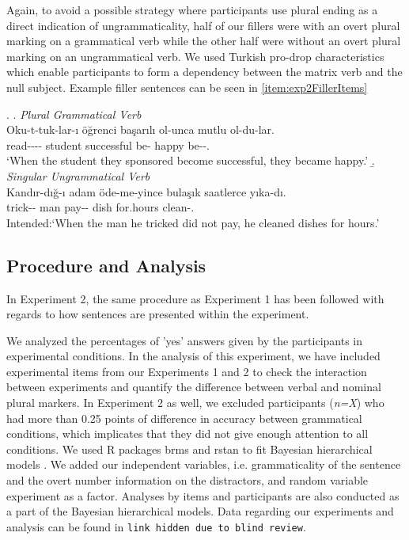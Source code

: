 \documentclass[doc,a4paper,man,natbib,floatsintext,noextraspace]{apa6}\usepackage[]{graphicx}\usepackage[]{color}
\begin{document}
Again, to avoid a possible strategy where participants use plural ending as a direct indication of ungrammaticality, half of our fillers were with an overt plural marking on a grammatical verb while the other half were without an overt plural marking on an ungrammatical verb. We used Turkish pro-drop characteristics which enable participants to form a dependency between the matrix verb and the null subject. Example filler sentences can be seen in \ref{item:exp2FillerItems} 

\ex. \label{item:exp2FillerItems}
\a. \textit{Plural Grammatical Verb}\\ 
\gll Oku-t-tuk-lar-ı öğrenci başarılı ol-unca mutlu ol-du-lar.\\ 
read-\Caus{}-\Nmlz{}-\Pl{}-\Poss{}  student successful be-\Nmlz{} happy be-\Pst{}-\Pl{}.\\
\glt `When the student they sponsored become successful, they became happy.' 
\b. \textit{Singular Ungrammatical Verb}\\ 
\gll *Kandır-dığ-ı adam öde-me-yince bulaşık saatlerce yıka-dı.\\ 
trick-\Nmlz{}-\Poss{}  man pay-\Neg{}-\Nmlz{} dish for.hours clean-\Pst{}.\\
\glt Intended:`When the man he tricked did not pay, he cleaned dishes for hours.'


\subsection{Procedure and Analysis} \label{sec:exp2:procedure_analysis}









In Experiment 2, the same procedure as Experiment 1 has been followed with regards to how sentences are presented within the experiment. 

We analyzed the percentages of 'yes' answers given by the participants in experimental conditions. In the analysis of this experiment, we have included experimental items from our Experiments 1 and 2 to check the interaction between experiments and quantify the difference between verbal and nominal plural markers. In Experiment 2 as well, we excluded participants (\textit{n=X}) who had more than 0.25 points of difference in accuracy between grammatical conditions, which implicates that they did not give enough attention to all conditions. We used R packages brms \citep{R-brms_b} and rstan \citep{R-stan} to fit Bayesian hierarchical models \citep{GelmanHill:2007}. We added our independent variables, i.e. grammaticality of the sentence and the overt number information on the distractors, and random variable experiment as a factor. Analyses by items and participants are also conducted as a 
part of the Bayesian hierarchical models. Data regarding our experiments and analysis can be found in \texttt{link hidden due to blind review}.
\end{document}
